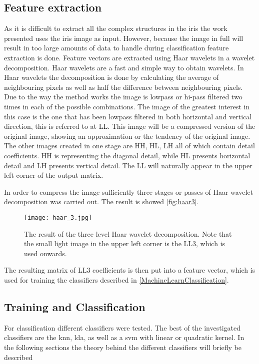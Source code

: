 \subsection{Feature extraction}
As it is difficult to extract all the complex structures in the iris the work presented uses the iris image as input. However, because the image in full will result in too large amounts of data to handle during classification feature extraction is done. Feature vectors are extracted using Haar wavelets in a wavelet decomposition. 
Haar wavelets are a fast and simple way to obtain wavelets. In Haar wavelets the decomposition is done by calculating the average of neighbouring pixels as well as half the difference between neighbouring pixels. Due to the way the method works the image is lowpass or hi-pass filtered two times in each of the possible combinations. The image of the greatest interest in this case is the one that has been lowpass filtered in both horizontal and vertical direction, this is referred to at LL. This image will be a compressed version of the original image, showing an approximation or the tendency of the original image. The other images created in one stage are HH, HL, LH all of which contain detail coefficients. HH is representing the diagonal detail, while HL presents horizontal detail and LH presents vertical detail. The LL will naturally appear in the upper left corner of the output matrix. 

In order to compress the image sufficiently three stages or passes of Haar wavelet decomposition was carried out. The result is showed \autoref{fig:haar3}. 
\begin{figure}[h]
\centering
\texttt{[image: haar\_3.jpg]}
\caption{The result of the three level Haar wavelet decomposition. Note that the small light image in the upper left corner is the LL3, which is used onwards.}
\label{fig:haar3}
\end{figure}
The resulting matrix of LL3 coefficients is then put into a feature vector, which is used for training the classifiers described in \autoref{MachineLearnClassification}.

\subsection{Training and Classification}
\label{MachineLearnClassification}
For classification different classifiers were tested. The best of the investigated classifiers are the \gls{knn}, \gls{lda}, as well as a \gls{svm} with linear or quadratic kernel. In the following sections the theory behind the different classifiers will briefly be described

